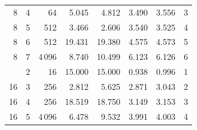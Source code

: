 \begin{table}[tbp]
\begin{tabular}{rrrrrrrr}
8 & 4 & 64 & 5.045 & 4.812 & 3.490 & 3.556 & 3\\
8 & 5 & 512 & 3.466 & 2.606 & 3.540 & 3.525 & 4\\
8 & 6 & 512 & 19.431 & 19.380 & 4.575 & 4.573 & 5\\
8 & 7 & 4\,096 & 8.740 & 10.499 & 6.123 & 6.126 & 6\\
\addlinespace
16 & 2 & 16 & 15.000 & 15.000 & 0.938 & 0.996 & 1\\
16 & 3 & 256 & 2.812 & 5.625 & 2.871 & 3.043 & 2\\
16 & 4 & 256 & 18.519 & 18.750 & 3.149 & 3.153 & 3\\
16 & 5 & 4\,096 & 6.478 & 9.532 & 3.991 & 4.003 & 4\\
\bottomrule
\end{tabular}
\end{table}
